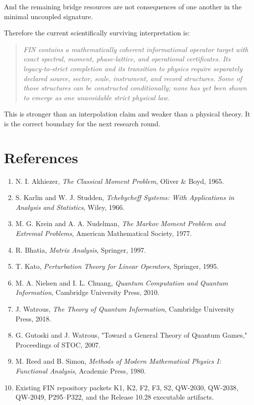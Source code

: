 \documentclass[11pt,a4paper,openany]{report}
\begin{document}
And the remaining bridge resources are not consequences of one another in the minimal uncoupled signature.

Therefore the current scientifically surviving interpretation is:

\begin{quote}\itshape
FIN contains a mathematically coherent informational operator target with exact spectral, moment, phase-lattice, and operational certificates.  Its legacy-to-strict completion and its transition to physics require separately declared source, sector, scale, instrument, and record structures.  Some of those structures can be constructed conditionally; none has yet been shown to emerge as one unavoidable strict physical law.

\end{quote}

This is stronger than an interpolation claim and weaker than a physical theory.  It is the correct boundary for the next research round.

\chapter{References}

\begin{enumerate}
\item 
N. I. Akhiezer, \emph{The Classical Moment Problem}, Oliver \& Boyd, 1965.

\item 
S. Karlin and W. J. Studden, \emph{Tchebycheff Systems: With Applications in Analysis and Statistics}, Wiley, 1966.

\item 
M. G. Krein and A. A. Nudelman, \emph{The Markov Moment Problem and Extremal Problems}, American Mathematical Society, 1977.

\item 
R. Bhatia, \emph{Matrix Analysis}, Springer, 1997.

\item 
T. Kato, \emph{Perturbation Theory for Linear Operators}, Springer, 1995.

\item 
M. A. Nielsen and I. L. Chuang, \emph{Quantum Computation and Quantum Information}, Cambridge University Press, 2010.

\item 
J. Watrous, \emph{The Theory of Quantum Information}, Cambridge University Press, 2018.

\item 
G. Gutoski and J. Watrous, "Toward a General Theory of Quantum Games," Proceedings of STOC, 2007.

\item 
M. Reed and B. Simon, \emph{Methods of Modern Mathematical Physics I: Functional Analysis}, Academic Press, 1980.

\item 
Existing FIN repository packets K1, K2, F2, F3, S2, QW-2030, QW-2038, QW-2049, P295--P322, and the Release 10.28 executable artifacts.

\end{enumerate}
\end{document}

